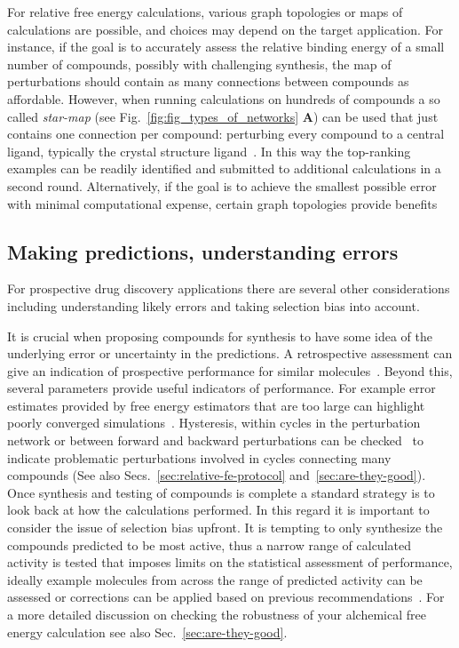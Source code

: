 \documentclass[9pt,bestpractices]{livecoms}
\begin{document}
For relative free energy calculations, various graph topologies or maps of calculations are possible, and choices may depend on the target application. For instance, if the goal is to accurately assess the relative binding energy of a small number of compounds, possibly with challenging synthesis, the map of perturbations should contain as many connections between compounds as affordable. However, when running calculations on hundreds of compounds a so called \emph{star-map} (see Fig.~\ref{fig:fig_types_of_networks} \textbf{A}) can be used that just contains one connection per compound: perturbing every compound to a central ligand, typically the crystal structure ligand~\cite{konze2019reactionbased}. In this way the top-ranking examples can be readily identified and submitted to additional calculations in a second round. Alternatively, if the goal is to achieve the smallest possible error with minimal computational expense, certain graph topologies provide benefits~\cite{yang2020optimal, xu2019optimal}


\subsection{Making predictions, understanding errors}
\label{subsec:predictions}
For prospective drug discovery applications there are several other considerations including understanding likely errors and taking selection bias into account. 

It is crucial when proposing compounds for synthesis to have some idea of the underlying error or uncertainty in the predictions. A retrospective assessment can give an indication of prospective performance for similar molecules~\cite{ciordia2016application}. Beyond this, several parameters provide useful indicators of performance. For example error estimates provided by free energy estimators that are too large can highlight poorly converged simulations~\cite{perez-benito2019predicting}. Hysteresis, within cycles in the perturbation network or between forward and backward perturbations can be checked~\cite{wang2013modeling} to indicate problematic perturbations involved in cycles connecting many compounds (See also Secs.~\ref{sec:relative-fe-protocol} and~\ref{sec:are-they-good}). Once synthesis and testing of compounds is complete a standard strategy is to look back at how the calculations performed. In this regard it is important to consider the issue of selection bias upfront. It is tempting to only synthesize the compounds predicted to be most active, thus a narrow range of calculated activity is tested that imposes limits on the statistical assessment of performance, ideally example molecules from across the range of predicted activity can be assessed or corrections can be applied based on previous recommendations~\cite{abel2017critical}. For a more detailed discussion on checking the robustness of your alchemical free energy calculation see also Sec.~\ref{sec:are-they-good}.
\end{document}
